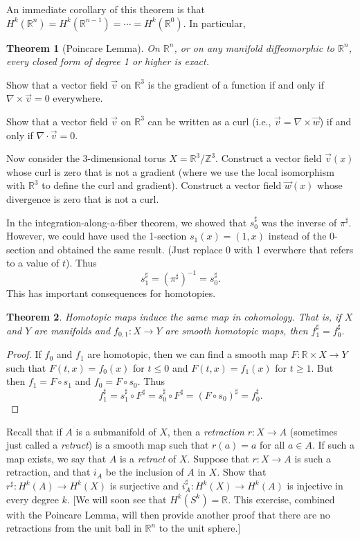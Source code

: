 \documentclass[12pt]{amsbook}
\newcommand{\R}{{\mathbb R}}
\newcommand{\Z}{{\mathbb Z}}
\newtheorem{thm}{Theorem}[section]
\theoremstyle{definition}
\begin{document}
\smallskip
 
An immediate corollary of this theorem 
is that $H^k(\R^n)=H^k(\R^{n-1})=\cdots=H^k(\R^0)$. 
In particular,
\begin{thm}[Poincare Lemma] On $\R^n$, or on any manifold diffeomorphic to 
$\R^n$, every closed form of degree 1 or higher is exact. 
\end{thm}

 Show that a vector field $\vec v$ on $\R^3$ is
the gradient of a function if and only if $\nabla \times \vec v=0$ everywhere.

 Show that a vector field $\vec v$ on $\R^3$ 
can be written
as a curl (i.e., $\vec v = \nabla \times \vec w$) if and only if 
$\nabla \cdot \vec v=0$. 

 Now consider the 3-dimensional torus 
$X = \R^3/\Z^3$. Construct a vector
field $\vec v(x)$ 
whose curl is zero that is not a gradient (where we use the local
isomorphism with $\R^3$ to define the curl and gradient). 
Construct a vector field
$\vec w(x)$ whose divergence is zero that is not a curl. 

In the integration-along-a-fiber theorem, we showed that $s_0^\sharp$ was 
the inverse of $\pi^\sharp$. However, we could have used the 1-section
$s_1(x)=(1,x)$ instead of the 0-section and obtained the same result. (Just
replace 0 with 1 everwhere that refers to a value of $t$). Thus
$$s_1^\sharp = (\pi^\sharp)^{-1}=s_0^\sharp.$$
This has important consequences for homotopies.

\begin{thm} Homotopic maps induce the {\em same} map in cohomology. 
That is, if $X$ and $Y$ are manifolds and $f_{0,1}: X \to Y$ are 
smooth homotopic maps, then $f_1^\sharp=f_0^\sharp$.
\end{thm}

\begin{proof}
If $f_0$ and $f_1$ are homotopic, then we can find a smooth map 
$F: \R \times X
\to Y$ such that $F(t,x)=f_0(x)$ for $t \le 0$ and $F(t,x)=f_1(x)$ for 
$t \ge 1$. But then $f_1 = F \circ s_1$ and $f_0=F\circ s_0$. Thus 
$$ f_1^\sharp = s_1^\sharp \circ F^\sharp = s_0^\sharp \circ F^\sharp
= (F \circ s_0)^\sharp = f_0^\sharp.$$
\end{proof}

 Recall that if $A$ is a submanifold of $X$, then a {\em retraction} 
$r: X \to A$ (sometimes just called a {\em retract}) is a smooth map such that $r(a)=a$ for all $a \in A$. If such a map exists, we say that 
$A$ is a {\em retract} of $X$.  Suppose that $r: X \to A$ is such a retraction,
and that $i_A$ be the inclusion
of $A$ in $X$.  Show that $r^\sharp:H^k(A)\to H^k(X)$ is surjective and 
$i_A^\sharp: H^k(X) \to H^k(A)$ is injective
in every degree $k$. [We will soon see that $H^k(S^k)=\R$. This exercise,
combined with the Poincare Lemma, will then
provide another proof that there are no retractions from the unit ball in 
$\R^n$ to the unit sphere.]
\end{document}
